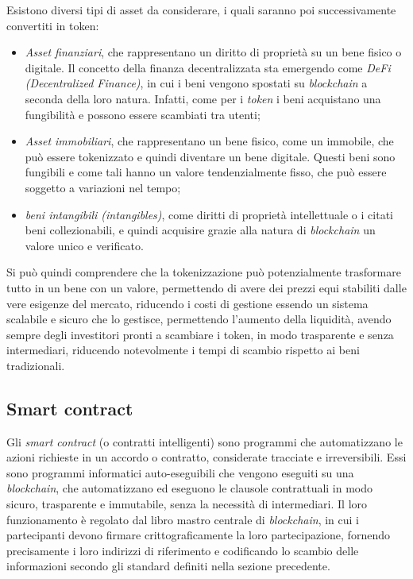 Esistono diversi tipi di asset da considerare, i quali saranno poi successivamente convertiti in token:
\begin{itemize}
    \item{\textit{Asset finanziari}}, che rappresentano un diritto di proprietà su un bene fisico o digitale. Il concetto della finanza decentralizzata sta emergendo come \textit{DeFi (Decentralized Finance)},
    in cui i beni vengono spostati su \textit{blockchain} a seconda della loro natura. Infatti, come per i \textit{token} i beni acquistano una fungibilità e possono essere scambiati tra utenti;
    \item{\textit{Asset immobiliari}}, che rappresentano un bene fisico, come un immobile, che può essere tokenizzato e quindi diventare un bene digitale. 
    Questi beni sono fungibili e come tali hanno un valore tendenzialmente fisso, che può essere soggetto a variazioni nel tempo;
    \item{\textit{beni intangibili (intangibles)}}, come diritti di proprietà intellettuale o i citati beni collezionabili,
    e quindi acquisire grazie alla natura di \textit{blockchain} un valore unico e verificato.
\end{itemize} 

Si può quindi comprendere che la tokenizzazione può potenzialmente trasformare tutto in un bene con un valore, permettendo di avere dei prezzi equi stabiliti dalle vere esigenze del mercato,
riducendo i costi di gestione essendo un sistema scalabile e sicuro che lo gestisce, permettendo l'aumento della liquidità, avendo sempre degli investitori pronti a scambiare i token, in modo trasparente
e senza intermediari, riducendo notevolmente i tempi di scambio rispetto ai beni tradizionali.

\subsection{Smart contract}\label{sec:tecnologiechain-avanziate-smart-contract}
Gli \textit{smart contract} (o contratti intelligenti) sono programmi che automatizzano le azioni richieste in un accordo o contratto, considerate tracciate e irreversibili. 
Essi sono programmi informatici auto-eseguibili che vengono eseguiti su una \textit{blockchain}, che automatizzano ed eseguono le clausole contrattuali in modo sicuro, trasparente e immutabile, senza la necessità di intermediari.
Il loro funzionamento è regolato dal libro mastro centrale di \textit{blockchain}, in cui i partecipanti devono firmare crittograficamente la loro partecipazione, fornendo precisamente i loro indirizzi di riferimento 
e codificando lo scambio delle informazioni secondo gli standard definiti nella sezione precedente. \\

